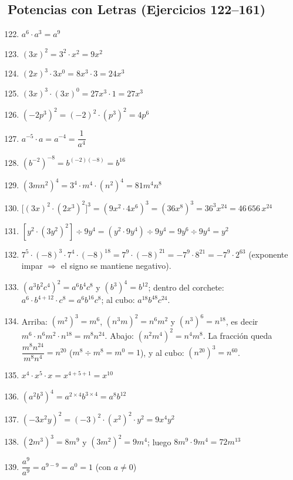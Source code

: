 \documentclass[12pt, letterpaper]{article}
\begin{document}
\subsection*{Potencias con Letras (Ejercicios 122--161)}

\begin{enumerate}[leftmargin=*, label=\textbf{\arabic*.}]
  \setcounter{enumi}{121}
  \item $a^6 \cdot a^3 = a^9$
  \item $(3x)^2 = 3^2 \cdot x^2 = 9x^2$
  \item $(2x)^3 \cdot 3x^0 = 8x^3 \cdot 3 = 24x^3$
  \item $(3x)^3 \cdot (3x)^0 = 27x^3 \cdot 1 = 27x^3$
  \item $(-2p^3)^2 = (-2)^2 \cdot (p^3)^2 = 4p^6$
  \item $a^{-5} \cdot a = a^{-4} = \dfrac{1}{a^4}$
  \item $(b^{-2})^{-8} = b^{(-2)(-8)} = b^{16}$
  \item $(3mn^2)^4 = 3^4 \cdot m^4 \cdot (n^2)^4 = 81m^4n^8$
  \item $\big[(3x)^2 \cdot (2x^3)^2\big]^3 = (9x^2 \cdot 4x^6)^3 = (36x^8)^3 = 36^3x^{24} = 46\,656\,x^{24}$
  \item $\left[y^2 \cdot (3y^2)^2\right] \div 9y^4 = (y^2 \cdot 9y^4) \div 9y^4 = 9y^6 \div 9y^4 = y^2$
  \item $7^5 \cdot (-8)^3 \cdot 7^4 \cdot (-8)^{18} = 7^9 \cdot (-8)^{21} = -7^9 \cdot 8^{21} = -7^9 \cdot 2^{63}$ (exponente impar $\Rightarrow$ el signo se mantiene negativo).
  \item $(a^3 b^2 c^4)^2 = a^6 b^4 c^8$ y $(b^3)^4 = b^{12}$; dentro del corchete: $a^6 \cdot b^{4+12} \cdot c^8 = a^6 b^{16} c^8$; al cubo: $a^{18} b^{48} c^{24}$.
  \item Arriba: $(m^2)^3 = m^6$, $(n^3 m)^2 = n^6 m^2$ y $(n^3)^6 = n^{18}$, es decir $m^6 \cdot n^6 m^2 \cdot n^{18} = m^8 n^{24}$. Abajo: $(n^2 m^4)^2 = n^4 m^8$. La fracción queda $\dfrac{m^8 n^{24}}{m^8 n^4} = n^{20}$ ($m^8 \div m^8 = m^0 = 1$), y al cubo: $\left(n^{20}\right)^3 = n^{60}$.
  \item $x^4 \cdot x^5 \cdot x = x^{4+5+1} = x^{10}$
  \item $(a^2b^3)^4 = a^{2 \times 4}b^{3 \times 4} = a^8b^{12}$
  \item $(-3x^2y)^2 = (-3)^2 \cdot (x^2)^2 \cdot y^2 = 9x^4y^2$
  \item $(2m^3)^3 = 8m^9$ y $(3m^2)^2 = 9m^4$; luego $8m^9 \cdot 9m^4 = 72m^{13}$
  \item $\dfrac{a^9}{a^9} = a^{9-9} = a^0 = 1$ (con $a \neq 0$)

\end{enumerate}
\end{document}
